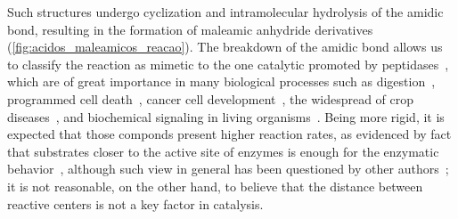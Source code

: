 %
Such structures undergo cyclization and intramolecular hydrolysis of the amidic
bond, resulting in the formation of maleamic anhydride derivatives (\autoref{fig:acidos_maleamicos_reacao}).
The breakdown of the amidic bond allows us to classify the reaction as mimetic
to the one catalytic promoted by peptidases~\cite{Kirby_1972},
which are of great importance in many biological processes such as
digestion~\cite{Lehninger_2012}, programmed cell death~\cite{Fesik_2001},
cancer cell development~\cite{Kenny_1989},
the widespread of crop diseases~\cite{Kapust_2000},
and biochemical signaling in living
organisms~\cite{Lehninger_2012,Borissoff_2009}.
Being more rigid, it is expected that those componds present higher reaction
rates, as evidenced by fact that substrates closer to the active site of
enzymes is enough for the enzymatic behavior~\cite{Souza_2017},
although such view in general has been questioned by other authors~\cite{Nobel_2013};
it is not reasonable, on the other hand, to believe that the distance between
reactive centers is not a key factor in catalysis.
